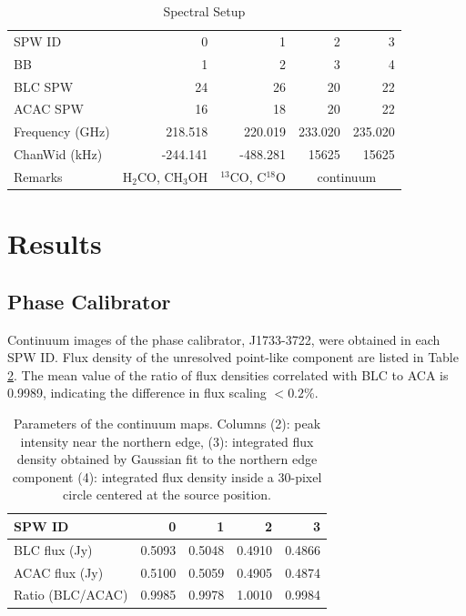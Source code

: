 \documentclass[a4paper, 10pt]{scrartcl}
\begin{document}
\begin{table}[h]
\centering
\caption{Spectral Setup}
\label{tab:SPW}
\begin{tabular}{l|rrrr} \hline \hline
SPW ID  &  0 &  1 &  2 &  3  \\
BB      &  1 &  2 &  3 &  4  \\
BLC SPW & 24 & 26 & 20 & 22  \\
ACAC SPW& 16 & 18 & 20 & 22  \\ 
Frequency (GHz)  &  218.518 & 220.019 & 233.020 & 235.020 \\
ChanWid (kHz)    & -244.141 & -488.281& 15625   & 15625 \\ 
Remarks &  H$_2$CO, CH$_3$OH & $^{13}$CO, C$^{18}$O & \multicolumn{2}{c}{continuum} \\ \hline
\end{tabular}
\end{table}

\section{Results}
\subsection{Phase Calibrator}\label{subsec:phasecal}

Continuum images of the phase calibrator, J1733-3722, were obtained in each SPW ID.
Flux density of the unresolved point-like component are listed in Table \ref{tab:contimage}.
The mean value of the ratio of flux densities correlated with BLC to ACA is 0.9989, indicating the difference in flux scaling $< 0.2$\%.

\begin{table}[h]
\centering
\caption{Parameters of the continuum maps. Columns (2): peak intensity near the northern edge, (3): integrated flux density obtained by Gaussian fit to the northern edge component (4): integrated flux density inside a 30-pixel circle centered at the source position.}
\label{tab:contimage}
\begin{tabular}{l|r|r|r|r} \hline \hline
SPW ID & 0      & 1      & 2  & 3  \\ \hline
BLC flux (Jy)   & 0.5093 & 0.5048 & 0.4910 & 0.4866 \\
ACAC flux (Jy)  & 0.5100 & 0.5059 & 0.4905 & 0.4874 \\ 
Ratio (BLC/ACAC)& 0.9985 & 0.9978 & 1.0010 & 0.9984 \\ \hline
\end{tabular}
\end{table}
\end{document}
